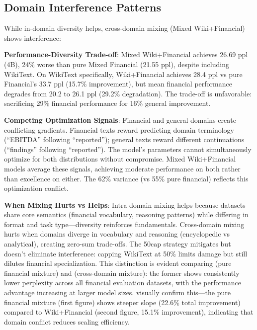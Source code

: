 \subsection{Domain Interference Patterns}

While in-domain diversity helps, cross-domain mixing (Mixed Wiki+Financial) shows interference:

\textbf{Performance-Diversity Trade-off}: Mixed Wiki+Financial achieves 26.69 ppl (4B), 24\% worse than pure Mixed Financial (21.55 ppl), despite including WikiText. On WikiText specifically, Wiki+Financial achieves 28.4 ppl vs pure Financial's 33.7 ppl (15.7\% improvement), but mean financial performance degrades from 20.2 to 26.1 ppl (29.2\% degradation). The trade-off is unfavorable: sacrificing 29\% financial performance for 16\% general improvement.

\textbf{Competing Optimization Signals}: Financial and general domains create conflicting gradients. Financial texts reward predicting domain terminology (``EBITDA'' following ``reported''); general texts reward different continuations (``findings'' following ``reported''). The model's parameters cannot simultaneously optimize for both distributions without compromise. Mixed Wiki+Financial models average these signals, achieving moderate performance on both rather than excellence on either. The 62\% variance (vs 55\% pure financial) reflects this optimization conflict.

\textbf{When Mixing Hurts vs Helps}: Intra-domain mixing helps because datasets share core semantics (financial vocabulary, reasoning patterns) while differing in format and task type—diversity reinforces fundamentals. Cross-domain mixing hurts when domains diverge in vocabulary and reasoning (encyclopedic vs analytical), creating zero-sum trade-offs. The 50cap strategy mitigates but doesn't eliminate interference: capping WikiText at 50\% limits damage but still dilutes financial specialization. This distinction is evident comparing  (pure financial mixture) and  (cross-domain mixture): the former shows consistently lower perplexity across all financial evaluation datasets, with the performance advantage increasing at larger model sizes.  visually confirm this—the pure financial mixture (first figure) shows steeper slope (22.6\% total improvement) compared to Wiki+Financial (second figure, 15.1\% improvement), indicating that domain conflict reduces scaling efficiency.

